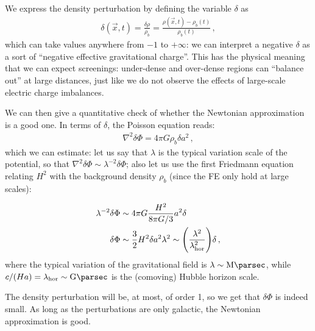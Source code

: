 \documentclass[main.tex]{subfiles}
\begin{document}
We express the density perturbation by defining the variable \(\delta \) as
%
\begin{align}
  \delta (\vec{x}, t) = \frac{ \delta \rho}{\rho _b} = \frac{\rho (\vec{x}, t) - \rho _b (t)}{\rho _b (t)}
\,,
\end{align}
%
which can take values anywhere from \(-1\) to \(+ \infty \): we can interpret a negative \(\delta \) as a sort of ``negative effective gravitational charge''. This has the physical meaning that we can expect screenings: under-dense and over-dense regions can ``balance out'' at large distances, just like we do not observe the effects of large-scale  electric charge imbalances.


We can then give a quantitative check of whether the Newtonian approximation is a good one. In terms of \(\delta \), the Poisson equation reads: 
%
\begin{align}
  \nabla^2 \delta \Phi  = 4 \pi G \rho _b \delta  a^2  
\,,
\end{align}
%
which we can estimate: let us say that \(\lambda \) is the typical variation scale of the potential, so that \(\nabla^2 \delta \Phi \sim \lambda^{-2} \delta \Phi \); also let us use the first Friedmann equation relating \(H^2\) with the background density \(\rho _b\) (since the FE only hold at large scales):

%
\begin{align}
  \lambda^{-2} \delta \Phi &\sim 4 \pi G \frac{H^2}{ 8 \pi G / 3} a^2 \delta  \\
  \delta \Phi &\sim \frac{3}{2} H^2 \delta a^2 \lambda^2 \sim  \qty(\frac{\lambda^2  }{\lambda _{\text{hor}}^2}) \delta 
\,,
\end{align}
%
where the typical variation of the gravitational field is \(\lambda \sim \SI{}{\mega\parsec}\), while \(c / (H a) = \lambda _{\text{hor}} \sim \SI{}{\giga\parsec}\) is the (comoving) Hubble horizon scale. 


The density perturbation will be, at most, of order 1, so we get that \(\delta \Phi \) is indeed small.
As long as the perturbations are only galactic, the Newtonian approximation is good. 
\end{document}
